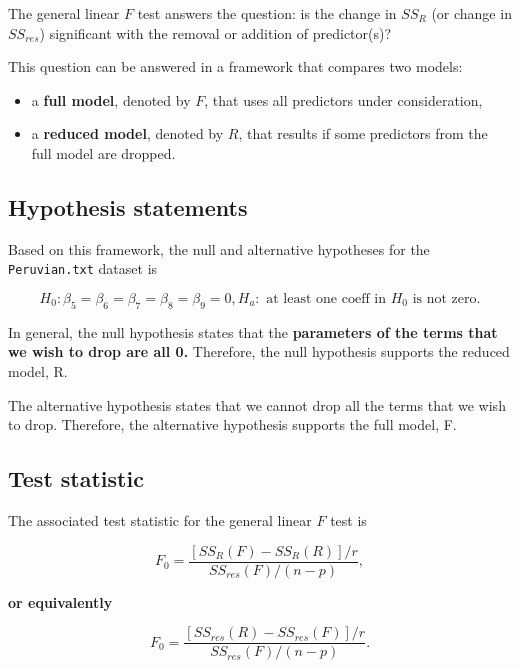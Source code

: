 \documentclass[
]{book}
\providecommand{\tightlist}{%
  \setlength{\itemsep}{0pt}\setlength{\parskip}{0pt}}
\begin{document}
The general linear \(F\) test answers the question: is the change in \(SS_R\) (or change in \(SS_{res}\)) significant with the removal or addition of predictor(s)?

This question can be answered in a framework that compares two models:

\begin{itemize}
\tightlist
\item
  a \textbf{full model}, denoted by \(F\), that uses all predictors under consideration,
\item
  a \textbf{reduced model}, denoted by \(R\), that results if some predictors from the full model are dropped.
\end{itemize}

\hypertarget{hypothesis-statements-1}{%
\subsection{Hypothesis statements}\label{hypothesis-statements-1}}

Based on this framework, the null and alternative hypotheses for the \texttt{Peruvian.txt} dataset is

\[
H_0: \beta_5 = \beta_6 = \beta_7 = \beta_8 = \beta_9 = 0, H_a: \text{ at least one coeff in } H_0 \text{ is not zero}.
\]

In general, the null hypothesis states that the \textbf{parameters of the terms that we wish to drop are all 0.} Therefore, the null hypothesis supports the reduced model, R.

The alternative hypothesis states that we cannot drop all the terms that we wish to drop. Therefore, the alternative hypothesis supports the full model, F.

\hypertarget{test-statistic}{%
\subsection{Test statistic}\label{test-statistic}}

The associated test statistic for the general linear \(F\) test is

\begin{equation} 
F_0=\frac{[SS_R(F)-SS_R(R)]/r}{SS_{res}(F)/(n-p)},
\label{eq:7ssr}
\end{equation}

\textbf{or equivalently}

\begin{equation} 
F_0=\frac{[SS_{res}(R)-SS_{res}(F)]/r}{SS_{res}(F)/(n-p)}.
\label{eq:7sse}
\end{equation}
\end{document}
